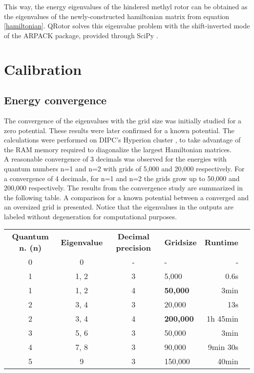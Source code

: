 \documentclass[12pt,a4paper]{article}
\begin{document}
This way, the energy eigenvalues of the hindered methyl rotor can be obtained as the eigenvalues of the newly-constructed hamiltonian matrix from equation \eqref{hamiltonian}. QRotor solves this eigenvalue problem with the shift-inverted mode of the ARPACK package, provided through SciPy \cite{arpack}.


\section{Calibration}


\subsection{Energy convergence}


The convergence of the eigenvalues with the grid size was initially studied for a zero potential. These results were later confirmed for a known potential. The calculations were performed on DIPC's Hyperion cluster \cite{hyperion}, to take advantage of the RAM memory required to diagonalize the largest Hamiltonian matrices.\\

A reasonable convergence of 3 decimals was observed for the energies with quantum numbers n=1 and n=2 with grids of 5,000 and 20,000 respectively. For a convergence of 4 decimals, for n=1 and n=2 the grids grow up to 50,000 and 200,000 respectively. The results from the convergence study are summarized in the following table. A comparison for a known potential \cite{titov2023} between a converged and an oversized grid is presented. Notice that the eigenvalues in the outputs are labeled without degeneration for computational purposes.

\begin{table}[H]
    \centering
    \begin{tabular}{ccclrr}
        \textbf{Quantum n. (n)} & \textbf{Eigenvalue} & \textbf{Decimal precision} & \textbf{Gridsize} & \textbf{Runtime} \\
        0  & 0     & -   & -             & -         \\
        1  & 1, 2  & 3   & 5,000         & 0.6s      \\
        1  & 1, 2  & 4   & \bf{50,000}   & 3min      \\
        2  & 3, 4  & 3   & 20,000        & 13s       \\
        2  & 3, 4  & 4   & \bf{200,000}  & 1h 45min  \\
        3  & 5, 6  & 3   & 50,000        & 3min      \\
        4  & 7, 8  & 3   & 90,000        & 9min 30s  \\
        5  & 9     & 3   & 150,000       & 40min
    \end{tabular}
    \end{table}
\end{document}
